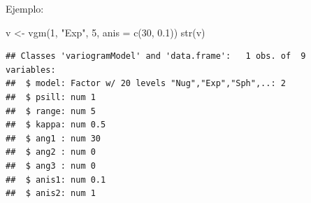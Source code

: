 \documentclass[
  spanish,
]{book}
\newenvironment{Shaded}{\begin{snugshade}}{\end{snugshade}}
\newcommand{\AttributeTok}[1]{\textcolor[rgb]{0.77,0.63,0.00}{#1}}
\newcommand{\DecValTok}[1]{\textcolor[rgb]{0.00,0.00,0.81}{#1}}
\newcommand{\FloatTok}[1]{\textcolor[rgb]{0.00,0.00,0.81}{#1}}
\newcommand{\FunctionTok}[1]{\textcolor[rgb]{0.00,0.00,0.00}{#1}}
\newcommand{\NormalTok}[1]{#1}
\newcommand{\OtherTok}[1]{\textcolor[rgb]{0.56,0.35,0.01}{#1}}
\newcommand{\StringTok}[1]{\textcolor[rgb]{0.31,0.60,0.02}{#1}}
\theoremstyle{break}
\theoremstyle{definition}
\theoremstyle{definition}
\theoremstyle{definition}
\theoremstyle{definition}
\theoremstyle{remark}
\begin{document}
Ejemplo:

\begin{Shaded}
\begin{Highlighting}[]
\NormalTok{v }\OtherTok{\textless{}{-}} \FunctionTok{vgm}\NormalTok{(}\DecValTok{1}\NormalTok{, }\StringTok{"Exp"}\NormalTok{, }\DecValTok{5}\NormalTok{, }\AttributeTok{anis =} \FunctionTok{c}\NormalTok{(}\DecValTok{30}\NormalTok{, }\FloatTok{0.1}\NormalTok{))}
\FunctionTok{str}\NormalTok{(v)}
\end{Highlighting}
\end{Shaded}

\begin{verbatim}
## Classes 'variogramModel' and 'data.frame':   1 obs. of  9 variables:
##  $ model: Factor w/ 20 levels "Nug","Exp","Sph",..: 2
##  $ psill: num 1
##  $ range: num 5
##  $ kappa: num 0.5
##  $ ang1 : num 30
##  $ ang2 : num 0
##  $ ang3 : num 0
##  $ anis1: num 0.1
##  $ anis2: num 1
\end{verbatim}
\end{document}
